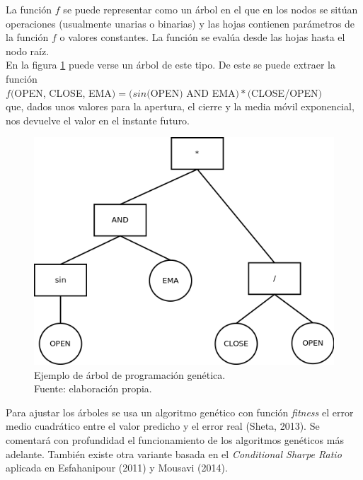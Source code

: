     La funci\'on $f$ se puede representar como un \'arbol en el que en los nodos se sit\'uan operaciones (usualmente unarias o binarias) y las hojas contienen par\'ametros de la funci\'on $f$ o valores constantes. La funci\'on se eval\'ua desde las hojas hasta el nodo ra\'iz. \\
   
       
    En la figura \ref{fig:inf_compl} puede verse un \'arbol de este tipo. De este se puede extraer la funci\'on \\
    $f($OPEN, CLOSE, EMA$) = (sin($OPEN$)$ AND EMA$) * ($CLOSE/OPEN$)$\\ que, dados unos valores para la apertura, el cierre y la media m\'ovil exponencial, nos devuelve el valor en el instante futuro.\\
    
	\begin{figure}[H]
		\centering
    	\includegraphics[scale=0.47]{imagenes/arbol_inf_comp.png}
    	\caption[Ejemplo de \'arbol de programaci\'on gen\'etica]{Ejemplo de \'arbol de programaci\'on gen\'etica.\\ Fuente: elaboraci\'on propia.}
    	\label{fig:inf_compl}
    \end{figure}

    
    Para ajustar los \'arboles se usa un algoritmo gen\'etico con funci\'on \textit{fitness} el error medio cuadr\'atico entre el valor predicho y el error real (Sheta, 2013). Se comentar\'a con profundidad el funcionamiento de los algoritmos gen\'eticos m\'as adelante. Tambi\'en existe otra variante basada en el \textit{Conditional Sharpe Ratio} aplicada en Esfahanipour (2011) y Mousavi (2014).\\
    
